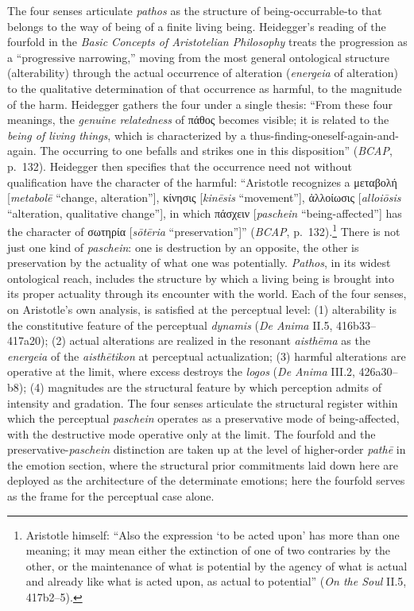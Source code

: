 \documentclass{article}
\newcommand{\gk}[1]{{\greekfont #1}}
\begin{document}
The four senses articulate \textit{pathos} as the structure of being-occurrable-to that belongs to the way of being of a finite living being. Heidegger's reading of the fourfold in the \textit{Basic Concepts of Aristotelian Philosophy} treats the progression as a ``progressive narrowing,'' moving from the most general ontological structure (alterability) through the actual occurrence of alteration (\textit{energeia} of alteration) to the qualitative determination of that occurrence as harmful, to the magnitude of the harm. Heidegger gathers the four under a single thesis: ``From these four meanings, the \textit{genuine relatedness} of \gk{πάθος} becomes visible; it is related to the \textit{being of living things}, which is characterized by a thus-finding-oneself-again-and-again. The occurring to one befalls and strikes one in this disposition'' (\textit{BCAP}, p.~132). Heidegger then specifies that the occurrence need not without qualification have the character of the harmful: ``Aristotle recognizes a \gk{μεταβολή} [\textit{metabolē} ``change, alteration''], \gk{κίνησις} [\textit{kinēsis} ``movement''], \gk{ἀλλοίωσις} [\textit{alloiōsis} ``alteration, qualitative change''], in which \gk{πάσχειν} [\textit{paschein} ``being-affected''] has the character of \gk{σωτηρία} [\textit{sōtēria} ``preservation'']'' (\textit{BCAP}, p.~132).\footnote{Aristotle himself: ``Also the expression `to be acted upon' has more than one meaning; it may mean either the extinction of one of two contraries by the other, or the maintenance of what is potential by the agency of what is actual and already like what is acted upon, as actual to potential'' (\textit{On the Soul} II.5, 417b2--5).} There is not just one kind of \textit{paschein}: one is destruction by an opposite, the other is preservation by the actuality of what one was potentially. \textit{Pathos}, in its widest ontological reach, includes the structure by which a living being is brought into its proper actuality through its encounter with the world. Each of the four senses, on Aristotle's own analysis, is satisfied at the perceptual level: (1) alterability is the constitutive feature of the perceptual \textit{dynamis} (\textit{De Anima} II.5, 416b33--417a20); (2) actual alterations are realized in the resonant \textit{aisthēma} as the \textit{energeia} of the \textit{aisthētikon} at perceptual actualization; (3) harmful alterations are operative at the limit, where excess destroys the \textit{logos} (\textit{De Anima} III.2, 426a30--b8); (4) magnitudes are the structural feature by which perception admits of intensity and gradation. The four senses articulate the structural register within which the perceptual \textit{paschein} operates as a preservative mode of being-affected, with the destructive mode operative only at the limit. The fourfold and the preservative-\textit{paschein} distinction are taken up at the level of higher-order \textit{pathē} in the emotion section, where the structural prior commitments laid down here are deployed as the architecture of the determinate emotions; here the fourfold serves as the frame for the perceptual case alone.
\end{document}
